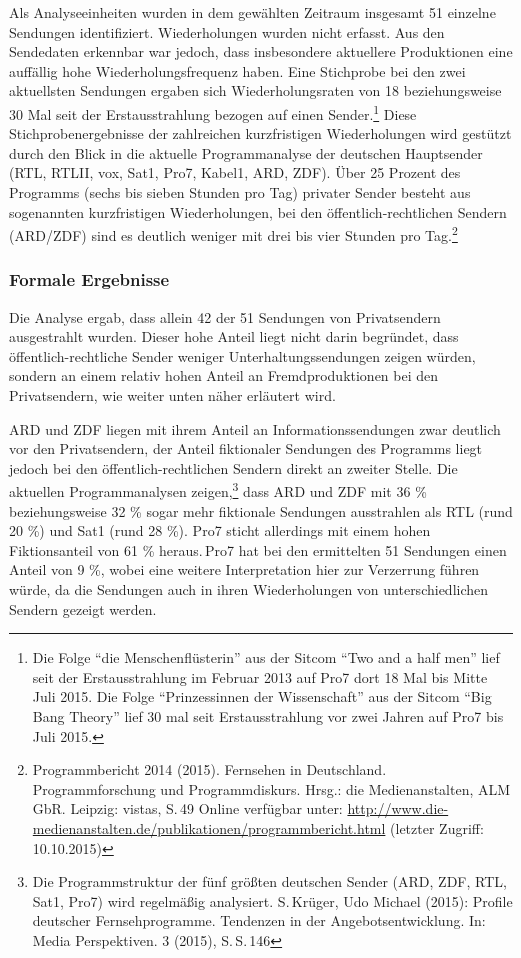 Als Analyseeinheiten wurden in dem gewählten Zeitraum insgesamt 51
einzelne Sendungen identifiziert. Wiederholungen wurden nicht erfasst.
Aus den Sendedaten erkennbar war jedoch, dass insbesondere aktuellere
Produktionen eine auffällig hohe Wiederholungsfrequenz haben. Eine
Stichprobe bei den zwei aktuellsten Sendungen ergaben sich
Wiederholungsraten von 18 beziehungsweise 30 Mal seit der
Erstausstrahlung bezogen auf einen Sender.\footnote{Die Folge
  \enquote{die Menschenflüsterin} aus der Sitcom \enquote{Two and a half
  men} lief seit der Erstausstrahlung im Februar 2013 auf Pro7 dort 18
  Mal bis Mitte Juli 2015. Die Folge \enquote{Prinzessinnen der
  Wissenschaft} aus der Sitcom \enquote{Big Bang Theory} lief 30 mal
  seit Erstausstrahlung vor zwei Jahren auf Pro7 bis Juli 2015.} Diese
Stichprobenergebnisse der zahlreichen kurzfristigen Wiederholungen wird
gestützt durch den Blick in die aktuelle Programmanalyse der deutschen
Hauptsender (RTL, RTLII, vox, Sat1, Pro7, Kabel1, ARD, ZDF). Über 25
Prozent des Programms (sechs bis sieben Stunden pro Tag) privater Sender
besteht aus sogenannten kurzfristigen Wiederholungen, bei den
öffentlich-rechtlichen Sendern (ARD/ZDF) sind es deutlich weniger mit
drei bis vier Stunden pro Tag.\footnote{Programmbericht 2014 (2015).
  Fernsehen in Deutschland. Programmforschung und Programmdiskurs.
  Hrsg.: die Medienanstalten, ALM GbR. Leipzig: vistas, S.\,49 Online
  verfügbar unter:
  \url{http://www.die-medienanstalten.de/publikationen/programmbericht.html}
  (letzter Zugriff: 10.10.2015)}

\subsubsection{Formale Ergebnisse}\label{formale-ergebnisse}

Die Analyse ergab, dass allein 42 der 51 Sendungen von Privatsendern
ausgestrahlt wurden. Dieser hohe Anteil liegt nicht darin begründet,
dass öffentlich-rechtliche Sender weniger Unterhaltungssendungen zeigen
würden, sondern an einem relativ hohen Anteil an Fremdproduktionen bei
den Privatsendern, wie weiter unten näher erläutert wird.

ARD und ZDF liegen mit ihrem Anteil an Informationssendungen zwar
deutlich vor den Privatsendern, der Anteil fiktionaler Sendungen des
Programms liegt jedoch bei den öffentlich-rechtlichen Sendern direkt an
zweiter Stelle. Die aktuellen Programmanalysen zeigen,\footnote{Die
  Programmstruktur der fünf größten deutschen Sender (ARD, ZDF, RTL,
  Sat1, Pro7) wird regelmäßig analysiert. S.\,Krüger, Udo Michael (2015):
  Profile deutscher Fernsehprogramme. Tendenzen in der
  Angebotsentwicklung. In: Media Perspektiven. 3 (2015), S.\,S.\,146} dass
ARD und ZDF mit 36 \% beziehungsweise 32 \% sogar mehr fiktionale
Sendungen ausstrahlen als RTL (rund 20 \%) und Sat1 (rund 28 \%). Pro7
sticht allerdings mit einem hohen Fiktionsanteil von 61 \% heraus.\,Pro7
hat bei den ermittelten 51 Sendungen einen Anteil von 9 \%, wobei eine
weitere Interpretation hier zur Verzerrung führen würde, da die
Sendungen auch in ihren Wiederholungen von unterschiedlichen Sendern
gezeigt werden.

